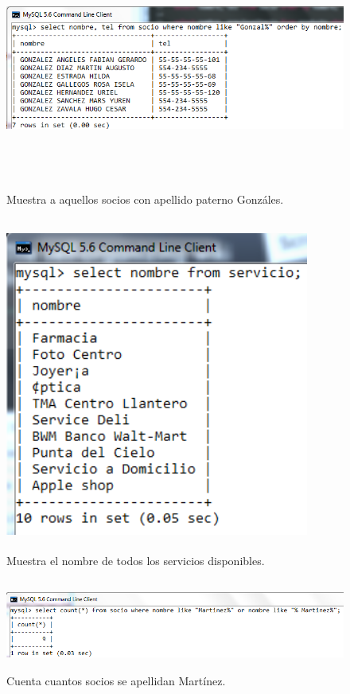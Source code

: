 \documentclass[12pt, titlepage]{article}
\begin{document}
\begin{figure}[H]
    \begin{center}
        \includegraphics[width=15cm, height=8cm]{img/gonzalez.png}
        \caption{Muestra a aquellos socios con apellido paterno Gonzáles.}
        \label{fig:arlter7}
    \end{center}
\end{figure}
\begin{figure}[H]
    \begin{center}
        \includegraphics[width=10cm, height=11cm]{img/servicios.png}
        \caption{Muestra el nombre de todos los servicios disponibles.}
        \label{fig:arlter8}
    \end{center}
\end{figure}
\begin{figure}[H]
    \begin{center}
        \includegraphics[width=14cm, height=3cm]{img/martinez.png}
        \caption{Cuenta cuantos socios se apellidan Martínez.}
        \label{fig:arlter9}
    \end{center}
\end{figure}
\end{document}
